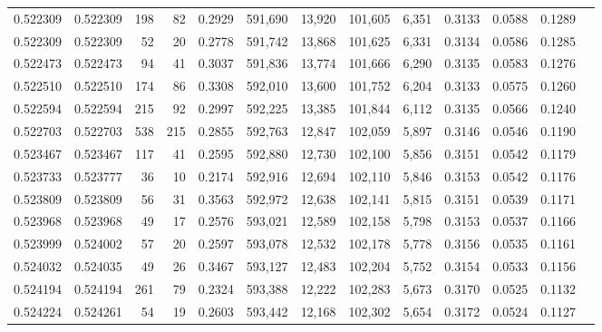 \begin{tabular}{rrrrrrrrrrrrr}
0.522309 & 0.522309 &   198 &    82 &                                     0.2929 & 591,690 &  13,920 & 101,605 &   6,351 & 0.3133 & 0.0588 & 0.1289 \\
0.522309 & 0.522309 &    52 &    20 &                                     0.2778 & 591,742 &  13,868 & 101,625 &   6,331 & 0.3134 & 0.0586 & 0.1285 \\
0.522473 & 0.522473 &    94 &    41 &                                     0.3037 & 591,836 &  13,774 & 101,666 &   6,290 & 0.3135 & 0.0583 & 0.1276 \\
0.522510 & 0.522510 &   174 &    86 &                                     0.3308 & 592,010 &  13,600 & 101,752 &   6,204 & 0.3133 & 0.0575 & 0.1260 \\
0.522594 & 0.522594 &   215 &    92 &                                     0.2997 & 592,225 &  13,385 & 101,844 &   6,112 & 0.3135 & 0.0566 & 0.1240 \\
0.522703 & 0.522703 &   538 &   215 &                                     0.2855 & 592,763 &  12,847 & 102,059 &   5,897 & 0.3146 & 0.0546 & 0.1190 \\
0.523467 & 0.523467 &   117 &    41 &                                     0.2595 & 592,880 &  12,730 & 102,100 &   5,856 & 0.3151 & 0.0542 & 0.1179 \\
0.523733 & 0.523777 &    36 &    10 &                                     0.2174 & 592,916 &  12,694 & 102,110 &   5,846 & 0.3153 & 0.0542 & 0.1176 \\
0.523809 & 0.523809 &    56 &    31 &                                     0.3563 & 592,972 &  12,638 & 102,141 &   5,815 & 0.3151 & 0.0539 & 0.1171 \\
0.523968 & 0.523968 &    49 &    17 &                                     0.2576 & 593,021 &  12,589 & 102,158 &   5,798 & 0.3153 & 0.0537 & 0.1166 \\
0.523999 & 0.524002 &    57 &    20 &                                     0.2597 & 593,078 &  12,532 & 102,178 &   5,778 & 0.3156 & 0.0535 & 0.1161 \\
0.524032 & 0.524035 &    49 &    26 &                                     0.3467 & 593,127 &  12,483 & 102,204 &   5,752 & 0.3154 & 0.0533 & 0.1156 \\
0.524194 & 0.524194 &   261 &    79 &                                     0.2324 & 593,388 &  12,222 & 102,283 &   5,673 & 0.3170 & 0.0525 & 0.1132 \\
0.524224 & 0.524261 &    54 &    19 &                                     0.2603 & 593,442 &  12,168 & 102,302 &   5,654 & 0.3172 & 0.0524 & 0.1127 \\

\end{tabular}
